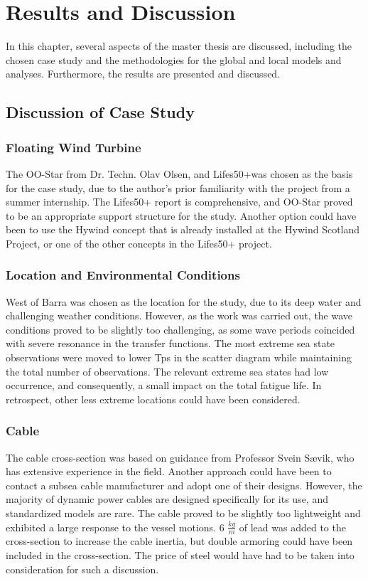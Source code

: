 \chapter{Results and Discussion}
\label{chap:discussion}
 In this chapter, several aspects of the master thesis are discussed, including the chosen case study and the methodologies for the global and local models and analyses. Furthermore, the results are presented and discussed. 
 \section{Discussion of Case Study}
 \subsection{Floating Wind Turbine}
The OO-Star from Dr. Techn. Olav Olsen, and Lifes50+was chosen as the basis for the case study, due to the author's prior familiarity with the project from a summer internship. The Lifes50+ report is comprehensive, and OO-Star proved to be an appropriate support structure for the study.  Another option could have been to use the Hywind concept that is already installed at the Hywind Scotland Project, or one of the other concepts in the Lifes50+ project.
\subsection{Location and Environmental Conditions}
West of Barra was chosen as the location for the study, due to its deep water and challenging weather conditions. However, as the work was carried out, the wave conditions proved to be slightly too challenging, as some wave periods coincided with severe resonance in the transfer functions. The most extreme sea state observations were moved to lower Tps in the scatter diagram while maintaining the total number of observations. The relevant extreme sea states had low occurrence, and consequently, a small impact on the total fatigue life. In retrospect, other less extreme locations could have been considered.
\subsection{Cable}
\label{sec:disccable}
The cable cross-section was based on guidance from Professor Svein Sævik, who has extensive experience in the field. Another approach could have been to contact a subsea cable manufacturer and adopt one of their designs.  However, the majority of dynamic power cables are designed specifically for its use, and standardized models are rare. The cable proved to be slightly too lightweight and exhibited a large response to the vessel motions. 6 $\frac{kg}{m}$ of lead was added to the cross-section to increase the cable inertia, but double armoring could have been included in the cross-section. The price of steel would have had to be taken into consideration for such a discussion.
